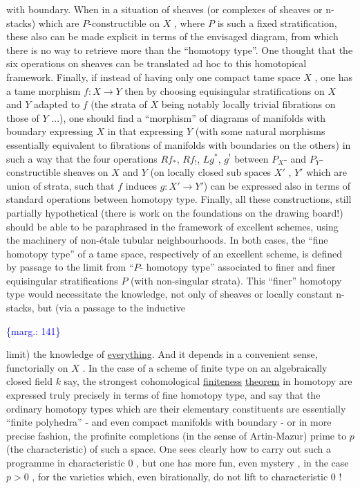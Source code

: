 \documentclass[11pt]{article}
\newcommand{\scanpage}[1]{\par\bigskip\noindent{\small\sffamily[scan #1]}\par}
\newcommand{\mspage}[1]{{\small\sffamily[p.\,#1]}}
\newcommand{\margin}[1]{\textcolor{blue}{\{\textsf{marg.:} #1\}}}
\newcommand{\uline}[1]{\underline{#1}}
\begin{document}
with boundary.  When in a situation of sheaves (or complexes
of sheaves or n-stacks) which are $P$-constructible on $X$ , where
$P$ is such a fixed stratification, these also can be made
explicit in terms of the envisaged diagram, from which there is
no way to retrieve more than the ``homotopy type''. One thought
that the six operations on sheaves can be translated ad hoc to
this homotopical framework. Finally, if instead of having only
one compact tame space $X$ , one has a tame morphism $f : X \to Y$
then by choosing equisingular stratifications on $X$ and $Y$
adapted to $f$ (the strata of $X$ being notably locally trivial
fibrations on those of $Y$ ...), one should find a ``morphism''
of diagrams of manifolds with boundary expressing $X$ in that
expressing $Y$ (with some natural morphisms essentially equivalent
to fibrations of manifolds with boundaries on the others) in
such a way that the four operations $Rf_*$, $Rf_!$, $Lg^*$, $g^!$ between
$P_X$- and $P_Y$- constructible sheaves on $X$ and $Y$ (on locally
closed sub spaces $X'$ , $Y'$ which are union of strata, such that
$f$ induces $g : X' \to Y'$) can be expressed also in terms of
standard operations between homotopy type. Finally, all these
constructions, still partially hypothetical (there is work on
the foundations on the drawing board!) should be able to be
paraphrased in the framework of excellent schemes, using the
machinery of non-étale tubular neighbourhoods. In both cases,
the ``fine homotopy type'' of a tame space, respectively of an
excellent scheme, is defined by passage to the limit from ``$P$-
homotopy type'' associated to finer and finer equisingular
stratifications $P$ (with non-singular strata). This ``finer''
homotopy type would necessitate the knowledge, not only of sheaves
or locally constant n-stacks, but (via a passage to the inductive

\margin{141}

\clearpage
\scanpage{134-2/141}
\mspage{-14-}

limit) the knowledge of \uline{everything}.  And it depends in a convenient
sense, functorially on $X$ .  In the case of a scheme of finite
type on an algebraically closed  field $k$  say, the strongest
cohomological \uline{finiteness} \uline{theorem} in homotopy are expressed truly
precisely in terms of fine homotopy type, and say that the
ordinary homotopy types which are their elementary constituents
are essentially ``finite polyhedra'' - and even compact manifolds
with boundary - or in more precise fashion, the profinite
completions (in the sense of Artin-Mazur) prime to $p$ (the
characteristic) of such a space.  One sees clearly how to carry
out such a programme in characteristic  $0$ , but one has  more
fun, even    mystery , in the case  $p > 0$ , for the varieties
which, even  birationally, do not lift to characteristic $0$ !
\end{document}
